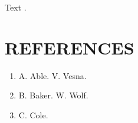 \documentclass{article}
\begin{document}
Text \cite{v,w}.
\section*{REFERENCES}
\begin{enumerate}
\item A. Able.
 V. Vesna.
\item B. Baker.
 W. Wolf.
\item C. Cole.
\end{enumerate}
\end{document}
